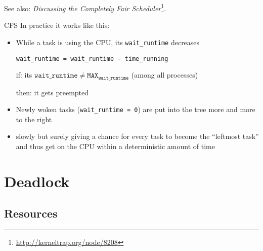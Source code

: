 See also: \emph{Discussing the Completely Fair
  Scheduler}\footnote{\url{http://kerneltrap.org/node/8208}}.

\begin{frame}{CFS}
  In practice it works like this:
  \begin{itemize}
  \item While a task is using the CPU, its \texttt{wait\_runtime} decreases
    \begin{center}
      \texttt{wait\_runtime = wait\_runtime - time\_running}
    \end{center}
  \item[if:] its $\mathtt{wait\_runtime \ne MAX_{wait\_runtime}}$
    (among all processes)
  \item[then:] it gets preempted
  \item Newly woken tasks (\texttt{wait\_runtime = 0}) are put into the tree more and more
    to the right
  \item slowly but surely giving a chance for every task to become the ``leftmost task'' and
    thus get on the CPU within a deterministic amount of time
  \end{itemize}
\end{frame}

\begin{frame}
  \begin{refsection}
    \nocite{wiki:sched} \printbibliography[heading=none]
  \end{refsection}
\end{frame}


\section{Deadlock}
\label{sec:deadlock}

\subsection{Resources}
\label{sec:resources}

